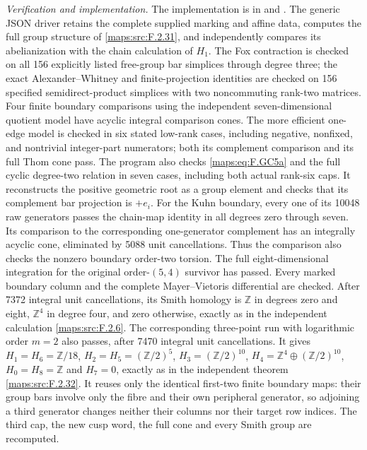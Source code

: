 \documentclass[11pt,a4paper]{article}
\theoremstyle{definition}
\begin{document}
\emph{Verification and implementation.}
The implementation is in 
and .
The generic JSON driver 
retains the complete supplied marking and affine data, computes
the full group structure of \ref{maps:src:F.2.31}, and independently compares
its abelianization with the chain calculation of $H_1$.
The Fox contraction is checked on all 156 explicitly listed
free-group bar simplices through degree three; the exact
Alexander--Whitney and finite-projection identities are
checked on 156 specified semidirect-product simplices with
two noncommuting rank-two matrices.
Four finite boundary comparisons using the independent
seven-dimensional quotient model have acyclic integral
comparison cones.  The more efficient one-edge model is
checked in six stated low-rank cases, including negative,
nonfixed, and nontrivial integer-part numerators; both its
complement comparison and its full Thom cone pass.
The program  also
checks \eqref{maps:eq:F.GC5a} and the full cyclic degree-two relation in
seven cases, including both actual rank-six caps.  It
reconstructs the positive geometric root as a group element
and checks that its complement bar projection is $+e_i$.
For the Kuhn boundary, every one of its 10048 raw generators
passes the chain-map identity in all degrees zero through
seven.  Its comparison to the corresponding one-generator
complement has an integrally acyclic cone, eliminated by
5088 unit cancellations.  Thus the comparison also checks
the nonzero boundary order-two torsion.
The full eight-dimensional integration for the original
order-$(5,4)$ survivor has passed.  Every marked boundary
column and the complete Mayer--Vietoris differential are
checked.  After 7372 integral unit cancellations, its Smith
homology is $\mathbb Z$ in degrees zero and eight,
$\mathbb Z^4$ in degree four, and zero otherwise, exactly
as in the independent calculation \ref{maps:src:F.2.6}.
The corresponding three-point run with logarithmic order
$m=2$ also passes, after 7470 integral unit cancellations.
It gives $H_1=H_6=\mathbb Z/18$,
$H_2=H_5=(\mathbb Z/2)^5$, $H_3=(\mathbb Z/2)^{10}$,
$H_4=\mathbb Z^4\oplus(\mathbb Z/2)^{10}$,
$H_0=H_8=\mathbb Z$ and $H_7=0$, exactly as in the
independent theorem \ref{maps:src:F.2.32}.  It reuses only the identical
first-two finite boundary maps: their group bars involve only
the fibre and their own peripheral generator, so adjoining
a third generator changes neither their columns nor their
target row indices.  The third cap, the new cusp word,
the full cone and every Smith group are recomputed.
\end{document}
